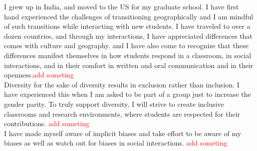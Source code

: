 \documentclass[10pt]{article}
\begin{document}
I grew up in India, and moved to the US for my graduate school. I have first hand experienced the challenges of transitioning geographically and I am mindful of such transitions while interacting with new students. %
I have traveled to over a dozen countries, and through my interactions, I have appreciated differences that comes with culture and geography. and I have also come to recognize that these differences manifest themselves in how students respond in a classroom, in social interactions, and in their comfort in written and oral communication and in their openness.\textcolor{red}{add someting}\\ %

Diversity for the sake of diversity results in exclusion rather than inclusion. I have experienced this when I am asked to be part of a group just to increase the gender parity. To truly support diversity, I will strive to create inclusive classrooms and research environments, where students are respected for their contributions. \textcolor{red}{add someting}\\
I have made myself aware of implicit biases and take effort to be aware of my biases as well as watch out for biases in social interactions. \textcolor{red}{add someting}%
\end{document}
